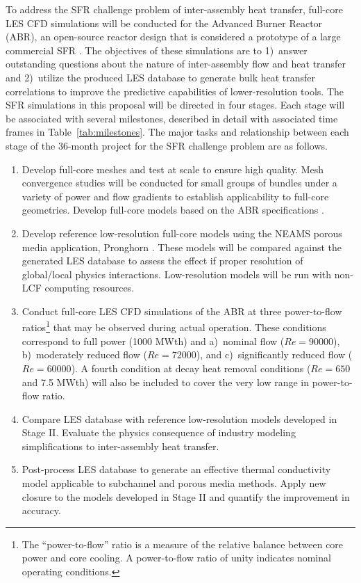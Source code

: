To address the SFR challenge problem of inter-assembly heat transfer, full-core
LES CFD simulations will be conducted for the Advanced Burner Reactor (ABR), an
open-source reactor design that is considered a prototype of a large commercial
SFR \cite{abr}. The objectives of these simulations are to 1)~answer
outstanding questions about the nature of inter-assembly flow and heat transfer
and 2)~utilize the produced LES database to generate bulk heat 
transfer correlations to improve the predictive capabilities of
lower-resolution tools. The SFR simulations in this proposal will be directed
in four stages. Each stage will be associated with several milestones, 
described in detail with associated time frames
in Table~\ref{tab:milestones}. The major tasks and relationship
between each stage of the 36-month project for the
SFR challenge problem are as follows. 

\vspace{-.15in}
\begin{enumerate}[label=\textbf{\Roman*}]
\item Develop full-core meshes and test at scale to ensure high quality. Mesh convergence studies will be conducted for small groups of bundles under a variety of power and flow gradients to establish applicability to full-core geometries. Develop full-core models based on the ABR specifications \cite{abr}.
\item Develop reference low-resolution full-core models using the NEAMS porous media application, Pronghorn \cite{novak2021b}. These models will be compared against the generated LES database to assess the effect if proper resolution of global/local physics interactions. Low-resolution models will be run with non-LCF computing resources.
\item Conduct full-core LES CFD simulations of the ABR at three power-to-flow ratios\footnote{The ``power-to-flow'' ratio is a measure of the relative balance between core power and core cooling. A power-to-flow ratio of unity indicates nominal operating conditions.} that may be observed during actual operation. These conditions correspond to full power (1000 MWth) and a)~nominal flow (\(Re=90000\)), b)~moderately reduced flow (\(Re=72000\)), and c)~significantly reduced flow (\(Re=60000\)). A fourth condition at decay heat removal conditions (\(Re=650\) and 7.5 MWth) will also be included to cover the very low range in power-to-flow ratio.
\item Compare LES database with reference low-resolution models developed in Stage II. Evaluate the physics consequence of industry modeling simplifications to inter-assembly heat transfer.
\item Post-process LES database to generate an effective thermal conductivity model applicable to subchannel and porous media methods. Apply new closure to the models developed in Stage II and quantify the improvement in accuracy. 
\end{enumerate}
\vspace{-.15in}

